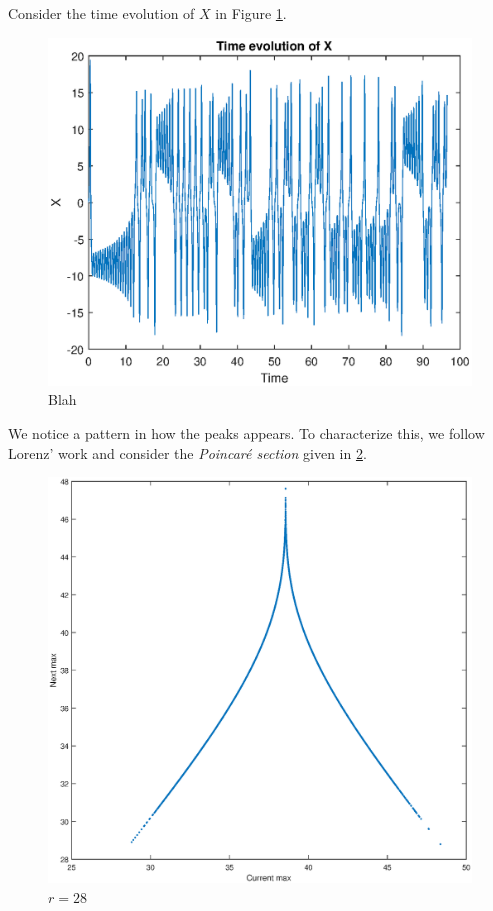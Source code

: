 \documentclass[twocolumn,amsmath,amssymb,aps]{revtex4}
\begin{document}
Consider the time evolution of $X$ in Figure \ref{fig:time_evolve}.
\begin{figure}[!htb]
	\centering
	\includegraphics[scale=0.5]{time_evolve}
	\caption{Blah}
	\label{fig:time_evolve}
\end{figure}
We notice a pattern in how the peaks appears. To characterize this, we follow Lorenz' work and consider the \textit{Poincar\'{e} section} given in \ref{fig:poincare_1}.
\begin{figure}[!htb]
	\centering
	\includegraphics[scale=0.4]{Poincare_section}
	\caption{$r = 28$}
	\label{fig:poincare_1}
\end{figure}
\end{document}
